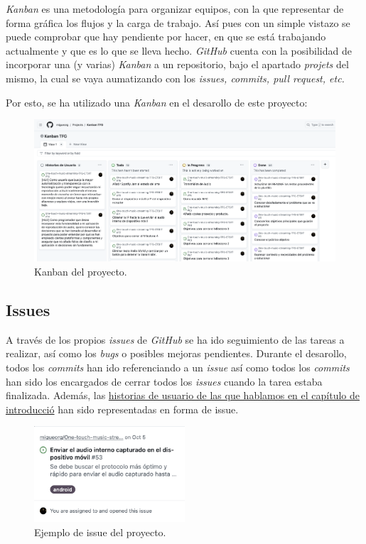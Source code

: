 \emph{Kanban} es una metodología para organizar equipos, con la que representar
de forma gráfica los flujos y la carga de trabajo. Así pues con un simple
vistazo se puede comprobar que hay pendiente por hacer, en que se está
trabajando actualmente y que es lo que se lleva hecho. \emph{GitHub} cuenta con
la posibilidad de incorporar una (y varias) \emph{Kanban} a un repositorio, bajo
el apartado \emph{projets} del mismo, la cual se vaya aumatizando con los
\emph{issues, commits, pull request, etc.}

Por esto, se ha utilizado una \emph{Kanban} en el desarollo de este proyecto:

\begin{figure}[H]
    \centering
    \includegraphics[width=\textwidth]{fotos/kanban.png}
    \caption{Kanban del proyecto.}
\end{figure}

\subsection{Issues}

A través de los propios \emph{issues} de \emph{GitHub} se ha ido seguimiento de
las tareas a realizar, así como los \emph{bugs} o posibles mejoras pendientes.
Durante el desarollo, todos los \emph{commits} han ido referenciando a un
\emph{issue} así como todos los \emph{commits} han sido los encargados de cerrar
todos los \emph{issues} cuando la tarea estaba finalizada. Además, las
\hyperref[historias-usuario]{historias de usuario de las que hablamos en el
capítulo de introducció} han sido representadas en forma de issue.

\begin{figure}[H]
    \centering
    \includegraphics[width=0.5\textwidth]{fotos/issues.png}
    \caption{Ejemplo de issue del proyecto.}
\end{figure}

